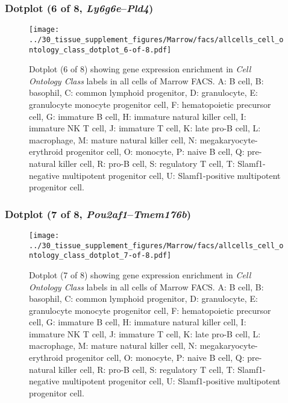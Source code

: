 \subsubsection{Dotplot (6 of 8, \emph{Ly6g6e}--\emph{Pld4})}
\begin{figure}[h]
\centering
\texttt{[image: ../30\_tissue\_supplement\_figures/Marrow/facs/allcells\_cell\_ontology\_class\_dotplot\_6-of-8.pdf]}

\caption{ Dotplot (6 of 8)  showing gene expression enrichment in \emph{Cell Ontology Class} labels in all cells of Marrow FACS. A: B cell, B: basophil, C: common lymphoid progenitor, D: granulocyte, E: granulocyte monocyte progenitor cell, F: hematopoietic precursor cell, G: immature B cell, H: immature natural killer cell, I: immature NK T cell, J: immature T cell, K: late pro-B cell, L: macrophage, M: mature natural killer cell, N: megakaryocyte-erythroid progenitor cell, O: monocyte, P: naive B cell, Q: pre-natural killer cell, R: pro-B cell, S: regulatory T cell, T: Slamf1-negative multipotent progenitor cell, U: Slamf1-positive multipotent progenitor cell.}
\end{figure}


\clearpage

\subsubsection{Dotplot (7 of 8, \emph{Pou2af1}--\emph{Tmem176b})}
\begin{figure}[h]
\centering
\texttt{[image: ../30\_tissue\_supplement\_figures/Marrow/facs/allcells\_cell\_ontology\_class\_dotplot\_7-of-8.pdf]}

\caption{ Dotplot (7 of 8)  showing gene expression enrichment in \emph{Cell Ontology Class} labels in all cells of Marrow FACS. A: B cell, B: basophil, C: common lymphoid progenitor, D: granulocyte, E: granulocyte monocyte progenitor cell, F: hematopoietic precursor cell, G: immature B cell, H: immature natural killer cell, I: immature NK T cell, J: immature T cell, K: late pro-B cell, L: macrophage, M: mature natural killer cell, N: megakaryocyte-erythroid progenitor cell, O: monocyte, P: naive B cell, Q: pre-natural killer cell, R: pro-B cell, S: regulatory T cell, T: Slamf1-negative multipotent progenitor cell, U: Slamf1-positive multipotent progenitor cell.}
\end{figure}


\clearpage

